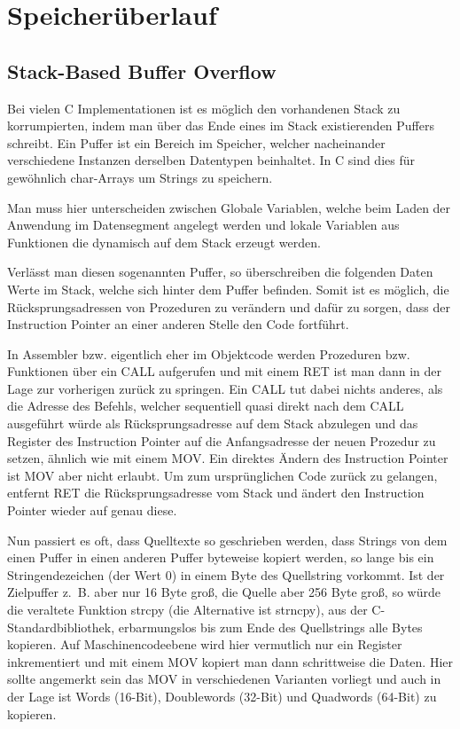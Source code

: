 \documentclass[12pt]{book}
\begin{document}
\chapter{Speicherüberlauf}

\section{Stack-Based Buffer Overflow}

Bei vielen C Implementationen ist es möglich den vorhandenen Stack zu
korrumpierten, indem man über das Ende eines im Stack existierenden Puffers
schreibt. Ein Puffer ist ein Bereich im Speicher, welcher nacheinander
verschiedene Instanzen derselben Datentypen beinhaltet. In C sind dies für
gewöhnlich char-Arrays um Strings zu speichern.

Man muss hier unterscheiden zwischen Globale Variablen, welche beim Laden der
Anwendung im Datensegment angelegt werden und lokale Variablen aus Funktionen
die dynamisch auf dem Stack erzeugt werden.

Verlässt man diesen sogenannten Puffer, so überschreiben die folgenden Daten
Werte im Stack, welche sich hinter dem Puffer befinden. Somit ist es möglich,
die Rücksprungsadressen von Prozeduren zu verändern und dafür zu sorgen, dass
der Instruction Pointer an einer anderen Stelle den Code fortführt.

In Assembler bzw. eigentlich eher im Objektcode werden Prozeduren bzw.
Funktionen über ein CALL aufgerufen und mit einem RET ist man dann in der Lage
zur vorherigen zurück zu springen. Ein CALL tut dabei nichts anderes, als die
Adresse des Befehls, welcher sequentiell quasi direkt nach dem CALL ausgeführt
würde als Rücksprungsadresse auf dem Stack abzulegen und das Register des
Instruction Pointer auf die Anfangsadresse der neuen Prozedur zu setzen, ähnlich
wie mit einem MOV. Ein direktes Ändern des Instruction Pointer ist MOV aber
nicht erlaubt. Um zum ursprünglichen Code zurück zu gelangen, entfernt RET die
Rücksprungsadresse vom Stack und ändert den Instruction Pointer wieder auf genau
diese.

Nun passiert es oft, dass Quelltexte so geschrieben werden, dass Strings von dem
einen Puffer in einen anderen Puffer byteweise kopiert werden, so lange bis ein
Stringendezeichen (der Wert 0) in einem Byte des Quellstring vorkommt. Ist der
Zielpuffer z. B. aber nur 16 Byte groß, die Quelle aber 256 Byte groß, so würde
die veraltete Funktion strcpy (die Alternative ist strncpy), aus der
C-Standardbibliothek, erbarmungslos bis zum Ende des Quellstrings alle Bytes
kopieren. Auf Maschinencodeebene wird hier vermutlich nur ein Register
inkrementiert und mit einem MOV kopiert man dann schrittweise die Daten. Hier
sollte angemerkt sein das MOV in verschiedenen Varianten vorliegt und auch in
der Lage ist Words (16-Bit), Doublewords (32-Bit) und Quadwords (64-Bit) zu
kopieren.
\end{document}
